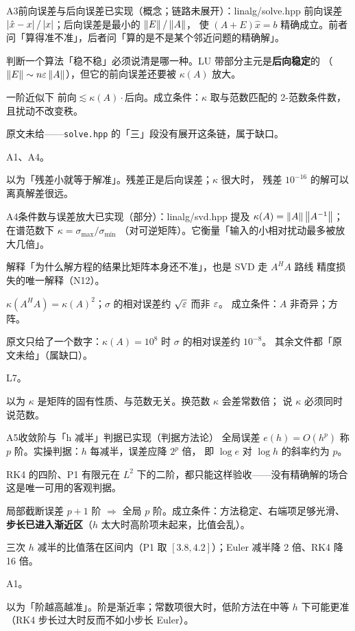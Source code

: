 \begin{know}{A3}{前向误差与后向误差}{已实现（概念；链路未展开）：linalg/solve.hpp}
 前向误差 $\left\lvert \hat x-x\right\rvert/\left\lvert x\right\rvert$；后向误差是最小的 $\left\lVert E\right\rVert/\left\lVert A\right\rVert$，
使 $(A+E)\hat x=b$ 精确成立。前者问「算得准不准」，后者问「算的是不是某个邻近问题的精确解」。

 判断一个算法「稳不稳」必须说清是哪一种。LU 带部分主元是\textbf{后向稳定}的
（$\left\lVert E\right\rVert\sim n\varepsilon\left\lVert A\right\rVert$），但它的前向误差还要被 $\kappa(A)$ 放大。

 一阶近似下 $\text{前向}\lesssim\kappa(A)\cdot\text{后向}$。成立条件：$\kappa$ 取与范数匹配的
2-范数条件数，且扰动不改变秩。

 原文未给——\texttt{solve.hpp} 的「三」段没有展开这条链，属于缺口。

 A1、A4。

 以为「残差小就等于解准」。残差正是后向误差；$\kappa$ 很大时，
残差 $10^{-16}$ 的解可以离真解差很远。
\end{know}

\begin{know}{A4}{条件数与误差放大}{已实现（部分）：linalg/svd.hpp 提及}
 $\kappa(A)=\left\lVert A\right\rVert\left\lVert A^{-1}\right\rVert$；在谱范数下 $\kappa=\sigma_{\max}/\sigma_{\min}$
（对可逆矩阵）。它衡量「输入的小相对扰动最多被放大几倍」。

 解释「为什么解方程的结果比矩阵本身还不准」，也是 SVD 走 $A^{H}A$ 路线
精度损失的唯一解释（N12）。

 $\kappa(A^{H}A)=\kappa(A)^{2}$；$\sigma$ 的相对误差约 $\sqrt{\varepsilon}$ 而非 $\varepsilon$。
成立条件：$A$ 非奇异；方阵。

 原文只给了一个数字：$\kappa(A)=10^{8}$ 时 $\sigma$ 的相对误差约 $10^{-8}$。
其余文件都「原文未给」（属缺口）。

 L7。

 以为 $\kappa$ 是矩阵的固有性质、与范数无关。换范数 $\kappa$ 会差常数倍；
说 $\kappa$ 必须同时说范数。
\end{know}

\begin{know}{A5}{收敛阶与「h 减半」判据}{已实现（判据方法论）}
 全局误差 $e(h)=O(h^{p})$ 称 $p$ 阶。实操判据：$h$ 每减半，误差应降 $2^{p}$ 倍，
即 $\log e$ 对 $\log h$ 的斜率约为 $p$。

 RK4 的四阶、P1 有限元在 $L^{2}$ 下的二阶，都只能这样验收——没有精确解的场合
这是唯一可用的客观判据。

 局部截断误差 $p+1$ 阶 $\Rightarrow$ 全局 $p$ 阶。成立条件：方法稳定、右端项足够光滑、
\textbf{步长已进入渐近区}（$h$ 太大时高阶项未起来，比值会乱）。

 三次 $h$ 减半的比值落在区间内（P1 取 $[3.8,4.2]$）；Euler 减半降 2 倍、RK4 降 16 倍。

 A1。

 以为「阶越高越准」。阶是渐近率；常数项很大时，低阶方法在中等 $h$ 下可能更准
（RK4 步长过大时反而不如小步长 Euler）。
\end{know}

